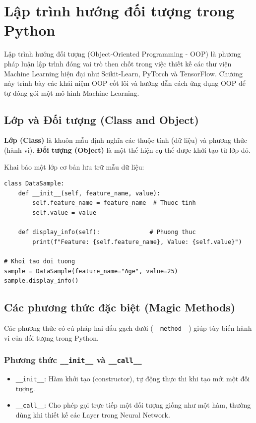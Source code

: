 \chapter{Lập trình hướng đối tượng trong Python}

Lập trình hướng đối tượng (Object-Oriented Programming - OOP) là phương pháp luận lập trình đóng vai trò then chốt trong việc thiết kế các thư viện Machine Learning hiện đại như Scikit-Learn, PyTorch và TensorFlow. Chương này trình bày các khái niệm OOP cốt lõi và hướng dẫn cách ứng dụng OOP để tự đóng gói một mô hình Machine Learning.

\section{Lớp và Đối tượng (Class and Object)}

\begin{definition}
\textbf{Lớp (Class)} là khuôn mẫu định nghĩa các thuộc tính (dữ liệu) và phương thức (hành vi). \textbf{Đối tượng (Object)} là một thể hiện cụ thể được khởi tạo từ lớp đó.
\end{definition}

\begin{example}
Khai báo một lớp cơ bản lưu trữ mẫu dữ liệu:
\end{example}

\begin{lstlisting}[caption={Khai báo Class và tạo Object trong Python}]
class DataSample:
    def __init__(self, feature_name, value):
        self.feature_name = feature_name  # Thuoc tinh
        self.value = value

    def display_info(self):              # Phuong thuc
        print(f"Feature: {self.feature_name}, Value: {self.value}")

# Khoi tao doi tuong
sample = DataSample(feature_name="Age", value=25)
sample.display_info()
\end{lstlisting}

\section{Các phương thức đặc biệt (Magic Methods)}

Các phương thức có cú pháp hai dấu gạch dưới (\texttt{\_\_method\_\_}) giúp tùy biến hành vi của đối tượng trong Python.

\subsection{Phương thức \texttt{\_\_init\_\_} và \texttt{\_\_call\_\_}}
\begin{itemize}
    \item \texttt{\_\_init\_\_}: Hàm khởi tạo (constructor), tự động thực thi khi tạo mới một đối tượng.
    \item \texttt{\_\_call\_\_}: Cho phép gọi trực tiếp một đối tượng giống như một hàm, thường dùng khi thiết kế các Layer trong Neural Network.
\end{itemize}

